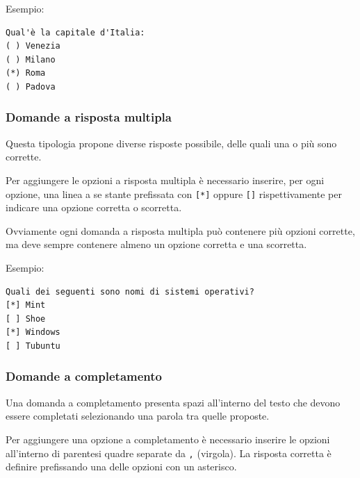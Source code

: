 \documentclass[12pt,a4paper]{article}
\begin{document}
\par Esempio: \\
\begin{verbatim}
Qual'è la capitale d'Italia:
( ) Venezia
( ) Milano
(*) Roma
( ) Padova
\end{verbatim}

\subsubsection{Domande a risposta multipla}

\par Questa tipologia propone diverse risposte possibile, delle quali una o più sono corrette. \\

\par Per aggiungere le opzioni a risposta multipla è necessario inserire, per ogni opzione, una linea a se stante prefissata con \texttt{[*]} oppure \texttt{[]} rispettivamente per indicare una opzione corretta o scorretta. \\

\par Ovviamente ogni domanda a risposta multipla può contenere più opzioni corrette, ma deve sempre contenere almeno un opzione corretta e una scorretta. \\

\par Esempio: \\
\begin{verbatim}
Quali dei seguenti sono nomi di sistemi operativi?
[*] Mint
[ ] Shoe
[*] Windows
[ ] Tubuntu
\end{verbatim}

\subsubsection{Domande a completamento}

\par Una domanda a completamento presenta spazi all'interno del testo che devono essere completati selezionando una parola tra quelle proposte. \\

\par Per aggiungere una opzione a completamento è necessario inserire le opzioni all'interno di parentesi quadre separate da \texttt{,} (virgola). La risposta corretta è definire prefissando una delle opzioni con un asterisco. \\
\end{document}
